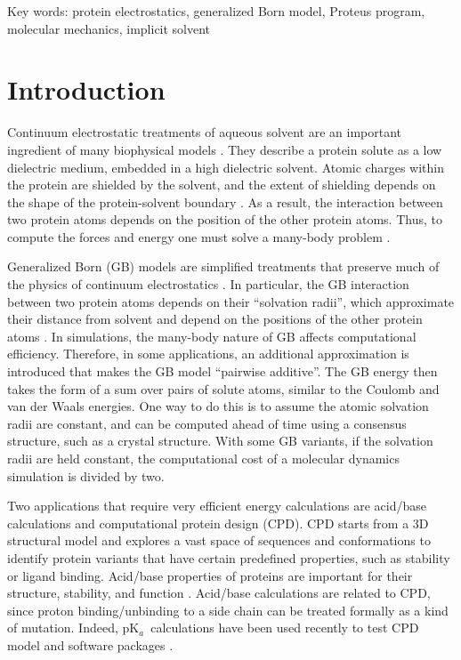 \documentclass[a4paper,12pt]{article}
\newcommand{\pk}{pK$_a$}
\begin{document}
\vfill
Key words: protein electrostatics, generalized Born model, Proteus program, molecular mechanics, implicit solvent

\parindent 8mm

\clearpage
\pagebreak

\section{Introduction}
Continuum electrostatic treatments of aqueous solvent \cite{FrohlichBK} are an important ingredient of many biophysical
models \cite{Schaefer98b,Kollman00,Simonson03,Baker05a}. They describe a protein solute as a low dielectric medium,
embedded in a high dielectric solvent. Atomic charges within the protein are shielded by the solvent, and the extent
of shielding depends on the shape of the protein-solvent boundary \cite{Shaw85,Zauhar85}. As a result, the interaction
between two protein atoms depends on the position of the other protein atoms. Thus, to compute the forces and energy
one must solve a many-body problem \cite{Schaefer90,Gilson93,Im98}.

Generalized Born (GB) models are simplified treatments that preserve much of the physics of continuum electrostatics
\cite{Still90,Bashford00,Feig04b}. In particular, the GB interaction between two protein atoms depends on their
``solvation radii'', which approximate their distance from solvent and depend on the positions of the other protein
atoms \cite{Hawkins95,Qiu97,Schaefer96,Lee02}. In simulations, the many-body nature of GB affects computational efficiency.
Therefore, in some applications, an additional approximation is introduced that makes the GB model ``pairwise additive''.
The GB energy then takes the form of a sum over pairs of solute atoms, similar to the Coulomb and van der Waals energies.
One way to do this is to assume the atomic solvation radii are constant, and can be computed ahead of time using a
consensus structure, such as a crystal structure. With some GB variants, if the solvation radii are held constant, the
computational cost of a molecular dynamics simulation is divided by two.

Two applications that require very efficient energy calculations are acid/base calculations and computational protein
design (CPD). CPD starts from a 3D structural model and explores a vast space of sequences and conformations to identify
protein variants that have certain predefined properties, such as stability or ligand binding. Acid/base properties of
proteins are important for their structure, stability, and function \cite{FershtBK,Onufriev13}. Acid/base calculations
are related to CPD, since proton binding/unbinding to a side chain can be treated formally as a kind of mutation. Indeed,
\pk\ calculations have been used recently to test CPD model and software packages \cite{Barth07,Kilambi12,Polydorides13}.
\end{document}
